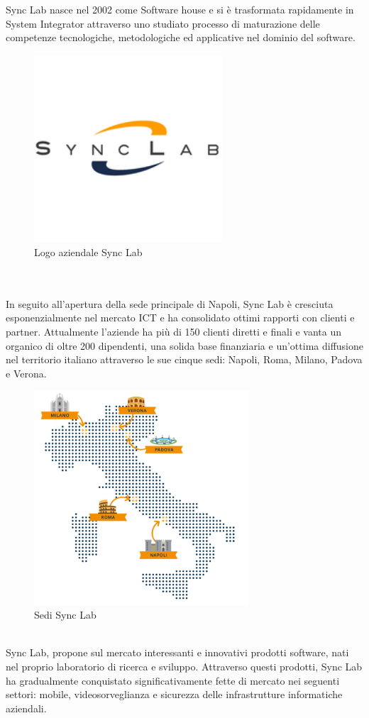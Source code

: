 Sync Lab nasce nel 2002 come Software house e si è trasformata rapidamente in System Integrator attraverso uno studiato processo di maturazione delle competenze tecnologiche, metodologiche ed applicative nel dominio del software.
\\
\begin{figure}[htbp]	
		\centering
		\includegraphics[width=7cm]{immagini/logo.png}
		\caption{Logo aziendale Sync Lab}
		\label{fig:Logo aziendale Sync Lab}
\end{figure}
\\
\\
In seguito all'apertura della sede principale di Napoli, Sync Lab è cresciuta esponenzialmente nel mercato ICT e ha consolidato ottimi rapporti con clienti e partner.
Attualmente l'aziende ha più di 150 clienti diretti e finali e vanta un organico di oltre 200 dipendenti, una solida base finanziaria e un'ottima diffusione nel territorio italiano attraverso le sue cinque sedi: Napoli, Roma, Milano, Padova e Verona.
\\
\begin{figure}[htbp]	
	\centering
	\includegraphics[width=8cm]{immagini/sedi.png}
	\caption{Sedi Sync Lab}
	\label{fig:Sedi Sync Lab}
\end{figure}
\\
Sync Lab, propone sul mercato interessanti e innovativi prodotti software, nati nel proprio laboratorio di ricerca e sviluppo. Attraverso questi prodotti, Sync Lab ha gradualmente conquistato significativamente fette di mercato nei seguenti settori: mobile, videosorveglianza e sicurezza delle infrastrutture informatiche aziendali.

